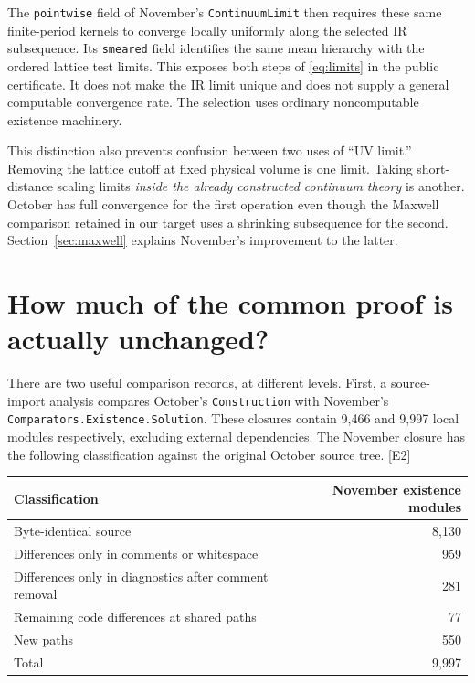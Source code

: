 \documentclass[11pt]{article}
\newcommand{\code}[1]{{\small\nolinkurl{#1}}}
\newcommand{\src}[1]{\textsf{[#1]}}
\begin{document}
The \code{pointwise} field of November's \code{ContinuumLimit} then requires
these same finite-period kernels to converge locally uniformly along the
selected IR subsequence. Its \code{smeared} field identifies the same mean
hierarchy with the ordered lattice test limits. This exposes both steps of
\eqref{eq:limits} in the public certificate. It does not make the IR limit
unique and does not supply a general computable convergence rate. The
selection uses ordinary noncomputable existence machinery.

This distinction also prevents confusion between two uses of ``UV limit.''
Removing the lattice cutoff at fixed physical volume is one limit. Taking
short-distance scaling limits \emph{inside the already constructed continuum
theory} is another. October has full convergence for the first operation
even though the Maxwell comparison retained in our target uses a shrinking
subsequence for the second. Section~\ref{sec:maxwell} explains November's
improvement to the latter.

\section{How much of the common proof is actually unchanged?}
\label{sec:common}

There are two useful comparison records, at different levels. First, a
source-import analysis compares October's \code{Construction} with November's
\code{Comparators.Existence.Solution}. These closures contain 9,466 and
9,997 local modules respectively, excluding external dependencies. The
November closure has the following classification against the original
October source tree. \src{E2}

\begin{center}
\begin{tabular}{lr}
\toprule Classification & November existence modules\\\midrule
Byte-identical source & 8,130\\
Differences only in comments or whitespace & 959\\
Differences only in diagnostics after comment removal & 281\\
Remaining code differences at shared paths & 77\\
New paths & 550\\\midrule
Total & 9,997\\\bottomrule
\end{tabular}
\end{center}
\end{document}
